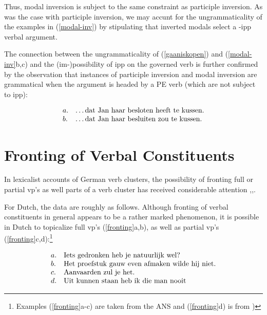\noindent Thus, modal inversion is subject to the same constraint as participle
inversion.  As was the case with participle inversion, we may accunt for the 
ungrammaticality of the examples in (\ref{modal-inv}) by stipulating that 
inverted modals select a {\sc -ipp} verbal argument. 

The connection between  the ungrammaticality of (\ref{gaaniskopen}) and
(\ref{modal-inv}b,c)  and the (im-)possibility of {\sc ipp} on the governed verb is
further confirmed by the observation that instances of participle inversion and
modal inversion are grammatical when the argument is headed by a PE verb (which 
are not subject to {\sc ipp}):

\begin{equation}
\begin{array}[t]{ll@{\hspace{0cm}}l}
a. && \ldots\mbox{dat Jan  haar besloten heeft te kussen.} \\
b. && \ldots\mbox{dat Jan haar besluiten zou te kussen.} \\
\end{array} 
\end{equation}

\section{Fronting of Verbal Constituents}

In lexicalist accounts of German verb clusters, the possibility of fronting full 
or partial {\sc vp}'s as well parts of a verb cluster has received considerable 
attention \cite{Nerbonne86},\cite{Johnson86},\cite{Nerbonne93}. 

For Dutch, the data are roughly as follows. Although fronting of verbal 
constituents in general appears to be a rather marked phenomenon, it is possible 
in Dutch to topicalize full {\sc vp}'s (\ref{fronting}a,b), as well as 
partial {\sc vp}'s (\ref{fronting}c,d):\footnote{
Examples (\ref{fronting}a-c) are taken 
from the ANS \cite{ans} and (\ref{fronting}d) is from )}

\begin{equation}
\label{fronting}
\begin{array}[t]{ll@{\hspace{0cm}}l}
a. && \mbox{Iets gedronken heb je natuurlijk wel?} \\
b. && \mbox{Het proefstuk gauw even afmaken wilde hij niet.} \\
c. && \mbox{Aanvaarden zul je het.} \\
d. && \mbox{Uit kunnen staan heb ik die man nooit} \\
\end{array} 
\end{equation}


